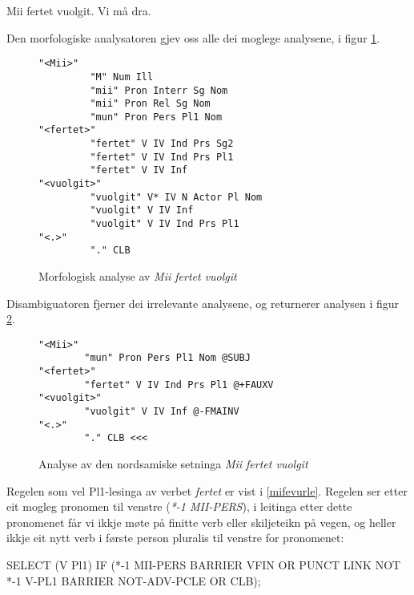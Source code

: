 \documentclass[a4paper,nynorsk]{article}
\begin{document}
\begin{example}\label{mifevutxt}
\gll Mii fertet vuolgit.
 Vi må dra.
\gln 
\glend
\end{example}


Den morfologiske analysatoren gjev oss alle dei moglege analysene, i figur \ref{mifevumulti}.%

\begin{figure}[htbp]
\begin{center}
\begin{verbatim}
"<Mii>"
         "M" Num Ill
         "mii" Pron Interr Sg Nom
         "mii" Pron Rel Sg Nom
         "mun" Pron Pers Pl1 Nom
"<fertet>"
         "fertet" V IV Ind Prs Sg2
         "fertet" V IV Ind Prs Pl1
         "fertet" V IV Inf
"<vuolgit>"
         "vuolgit" V* IV N Actor Pl Nom
         "vuolgit" V IV Inf
         "vuolgit" V IV Ind Prs Pl1
"<.>"
         "." CLB
\end{verbatim}
\caption{Morfologisk analyse av \emph{Mii fertet vuolgit}}
\label{mifevumulti}
\end{center}
\end{figure}

Disambiguatoren fjerner dei irrelevante analysene, og returnerer analysen i figur \ref{mifevu}. %

\begin{figure}[htbp]
\begin{center}
\begin{verbatim}
"<Mii>"
        "mun" Pron Pers Pl1 Nom @SUBJ
"<fertet>"
        "fertet" V IV Ind Prs Pl1 @+FAUXV
"<vuolgit>"
        "vuolgit" V IV Inf @-FMAINV
"<.>"
        "." CLB <<<
\end{verbatim}        
\caption{Analyse av den nordsamiske setninga \textit{Mii fertet vuolgit}}
\label{mifevu}
\end{center}
\end{figure}

Regelen som vel Pl1-lesinga av verbet \emph{fertet} er vist i \ref{mifevurle}. Regelen ser etter eit mogleg pronomen til venstre (\textit{*-1 MII-PERS}), i leitinga etter dette pronomenet får vi ikkje møte på finitte verb eller skiljeteikn på vegen, og heller ikkje eit nytt verb i første person pluralis til venstre for pronomenet:%

\begin{example}\label{mifevurle}
SELECT (V Pl1) IF (*-1 MII-PERS BARRIER VFIN OR PUNCT LINK NOT *-1 V-PL1 
	BARRIER NOT-ADV-PCLE OR CLB);
\end{example}	
\end{document}
